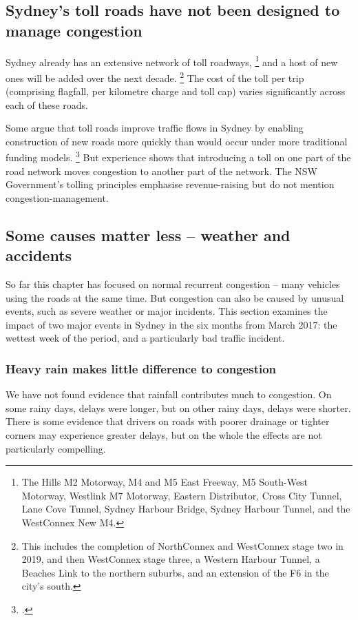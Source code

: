 \documentclass{grattan}
\begin{document}
\subsection{Sydney's toll roads have not been designed to manage congestion}

Sydney already has an extensive network of toll roadways,%
    \footnote{The Hills M2 Motorway, M4 and M5 East Freeway, M5 South-West Motorway, Westlink M7 Motorway, Eastern Distributor, Cross City Tunnel, Lane Cove Tunnel, Sydney Harbour Bridge, Sydney Harbour Tunnel, and the WestConnex New M4.}
and a host of new ones will   be added over the next decade.%
    \footnote{This includes the completion of NorthConnex and WestConnex stage two in 2019, and then WestConnex stage three, a Western Harbour Tunnel, a Beaches Link to the northern suburbs, and an extension of the F6 in the city's south.}
The cost of the toll per trip (comprising flagfall, per kilometre charge and toll cap) varies significantly across each of these roads.

Some argue that toll roads improve traffic flows in Sydney by enabling construction of new roads more quickly than would occur under more traditional funding models.%
    \footcite{BITRE-toll-roads-in-Australia}
But experience shows that introducing a toll on one part of the road network moves congestion to another part of the network.
The NSW Government's tolling principles emphasise revenue-raising but do not mention congestion-management.





\subsection{Some causes matter less -- weather and accidents}

So far this chapter has focused on normal recurrent congestion -- many  vehicles using the roads at the same time.
But congestion can also be caused by unusual events, such as severe weather or major incidents.
This section examines the impact of two major events in Sydney in the six months from March 2017: the wettest week of the period, and a particularly bad traffic incident.

\subsubsection{Heavy rain makes little difference to congestion}

We have not found evidence that rainfall contributes much to congestion.
On some rainy days, delays were longer, but on other rainy days, delays were shorter. There is some evidence that drivers on roads with poorer drainage or tighter corners may experience greater delays, but on the whole the effects are not particularly compelling.
\end{document}
